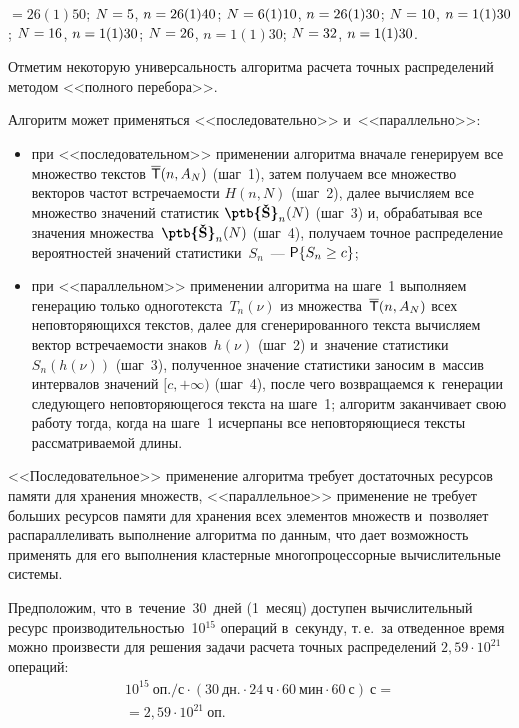 \begin{multicols}{2}
\pagebreak





\addtocounter{figure}{1}
\addtocounter{table}{1}

\noindent
$=26(1)50$; $N\hm= 5$, $n\hm= 26(1)40$; 
$N\hm=6(1)10$, $n\hm= 26(1)30$; $N\hm=10$, $n\hm=1(1)30$; $N\hm=16$, 
$n\hm=1(1)30$; $N\hm=26$, $n=1(1)30$; $N\hm=32$, $n\hm=1(1)30$.
    
    Отметим некоторую универсальность алгоритма расчета точных 
распределений методом <<полного перебора>>. 
    
    Алгоритм может применяться <<последовательно>> 
и~<<параллельно>>:
    \begin{itemize}
    \item при <<последовательном>> применении алгоритма вначале 
генерируем все множество текстов $\overline{\sf T}(n, A_N)$ (шаг~1), затем 
получаем все множество векторов частот встречаемости 
$H(n, N)$ (шаг~2), далее вычисляем все множество 
значений статистик $\mbox{{\textbf{\ptb{\v{S}}}}}_n(N)$ (шаг~3) и, обрабатывая все значения 
множества~$\mbox{{\textbf{\ptb{\v{S}}}}}_n(N)$ (шаг~4), получаем точное распределение 
вероятностей значений статистики~$S_n$~--- ${\sf P}\{S_n \hm\geq c\}$;
    \item при <<параллельном>> применении алгоритма на шаге~1 
выполняем генерацию только одного\linebreak текста~$T_n(\nu)$ из 
множества~$\overline{\sf T}(n, A_N)$ всех непо\-вторяющихся текстов, далее 
для сгенерированного текста вычисляем вектор встре\-ча\-емости 
знаков~$h(\nu)$ (шаг~2) и~значение статистики~$S_n(h(\nu))$ (шаг~3), 
полученное значение статистики заносим в~массив интервалов значений 
$[c, +\infty)$ (шаг~4), после чего возвращаемся к~генерации следующего 
неповторяющегося текста на шаге~1; алгоритм заканчивает свою работу 
тогда, когда на шаге~1 исчерпаны все неповторяющиеся тексты 
рассматриваемой длины.
    \end{itemize}
    
    <<Последовательное>> применение алгоритма требует достаточных 
ресурсов памяти для хранения множеств, <<параллельное>> применение 
не требует больших ресурсов памяти для хранения всех элементов 
множеств и~позволяет распараллеливать выполнение алгоритма по 
данным, что дает возможность применять для его выполнения кластерные 
многопроцессорные вычислительные системы.
    
    Предположим, что в~течение~30~дней (1~месяц) доступен 
вычислительный ресурс производительностью~10$^{15}$ операций 
в~секунду, т.\,е.\ за отведенное время можно произвести для решения 
задачи расчета точных распределений $2{,}59\cdot10^{21}$ операций:
    \begin{multline*}
10^{15}~\mbox{оп./с}\cdot (30~\mbox{дн.} \cdot 24~\mbox{ч}\cdot 
60~\mbox{мин}\cdot 60~\mbox{с})~\mbox{с} 
={}\\
{}=2{,}59\cdot10^{21}~\mbox{оп.}
\end{multline*}
    

\end{multicols}
